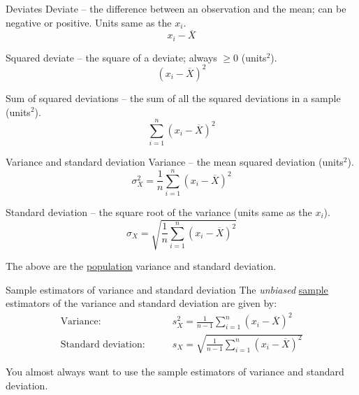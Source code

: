 \documentclass[presentation]{beamer}
\begin{document}
\begin{frame}[label={sec:orgheadline16}]{Deviates}
\alert{Deviate} -- the difference between an observation and the mean; can be negative or positive. Units same as the \(x_i\).
\[
x_i - \overline{X}
\]

\alert{Squared deviate} -- the square of a deviate; always \(\geq 0\) (units\(^2\)).
\[
(x_i - \overline{X})^2
\]

\alert{Sum of squared deviations} -- the sum of all the squared deviations in a sample (units\(^2\)). 
\[
\sum_{i=1}^n (x_i - \overline{X})^2
\]
\end{frame}

\begin{frame}[label={sec:orgheadline17}]{Variance and standard deviation}
\alert{Variance} -- the mean squared deviation (units\(^2\)).
\[
\sigma_X^2 = \frac{1}{n} \sum_{i=1}^n (x_i - \overline{X})^2 
\]

\alert{Standard deviation} -- the square root of the variance (units same as the \(x_i\)).
\[
\sigma_X = \sqrt{\frac{1}{n} \sum_{i=1}^n (x_i - \overline{X})^2}
\]

The above are the \uline{population} variance and standard deviation.  
\end{frame}


\begin{frame}[label={sec:orgheadline18}]{Sample estimators of variance and standard deviation}
The \emph{unbiased} \uline{sample} estimators of the variance and standard deviation are given by:
\begin{equation*}
\begin{split}
\mbox{Variance:}\qquad & s_X^2 = \frac{1}{n-1} \sum_{i=1}^n (x_i - \overline{X})^2 \\
\mbox{Standard deviation:}\qquad & s_X = \sqrt{\frac{1}{n-1} \sum_{i=1}^n (x_i - \overline{X})^2}
\end{split}
\end{equation*}

\alert{You almost always want to use the sample estimators of variance and standard deviation.}
\end{frame}
\end{document}
